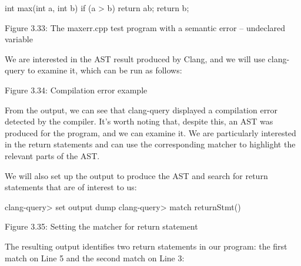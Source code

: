 \begin{cpp}
int max(int a, int b) {
  if (a > b) {
    return ab;
  }
  return b;
}
\end{cpp}

\begin{center}
Figure 3.33: The maxerr.cpp test program with a semantic error – undeclared variable
\end{center}

We are interested in the AST result produced by Clang, and we will use clang-query to examine it, which can be run as follows:


\begin{center}
Figure 3.34: Compilation error example
\end{center}

From the output, we can see that clang-query displayed a compilation error detected by the compiler. It's worth noting that, despite this, an AST was produced for the program, and we can examine it. We are particularly interested in the return statements and can use the corresponding matcher to highlight the relevant parts of the AST.

We will also set up the output to produce the AST and search for return statements that are of interest to us:

\begin{shell}
clang-query> set output dump
clang-query> match returnStmt()
\end{shell}

\begin{center}
Figure 3.35: Setting the matcher for return statement
\end{center}

The resulting output identifies two return statements in our program: the first match on Line 5 and the second match on Line 3:


